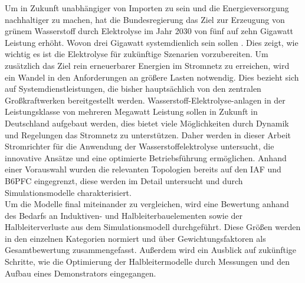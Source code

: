 Um in Zukunft unabhängiger von Importen zu sein und die Energieversorgung nachhaltiger zu machen, hat die Bundesregierung das Ziel zur Erzeugung von grünem Wasserstoff durch Elektrolyse im Jahr 2030 von fünf auf zehn Gigawatt Leistung erhöht. Wovon drei Gigawatt systemdienlich sein sollen \cite{BMWKH2}. Dies zeigt, wie wichtig es ist die Elektrolyse für zukünftige Szenarien vorzubereiten.
Um zusätzlich das Ziel rein erneuerbarer Energien im Stromnetz zu erreichen, wird ein Wandel in den Anforderungen an größere Lasten notwendig. Dies bezieht sich auf Systemdienstleistungen, die bisher hauptsächlich von den zentralen Großkraftwerken bereitgestellt werden. Wasserstoff-Elektrolyse-anlagen in der Leistungsklasse von mehreren Megawatt Leistung sollen in Zukunft in Deutschland aufgebaut werden, dies bietet viele Möglichkeiten durch Dynamik und Regelungen das Stromnetz zu unterstützen. Daher werden in dieser Arbeit Stromrichter für die Anwendung der Wasserstoffelektrolyse untersucht, die innovative Ansätze und eine optimierte Betriebsführung ermöglichen. Anhand einer Vorauswahl wurden die relevanten Topologien bereits auf den \gls{IAF} und \gls{B6PFC} eingegrenzt, diese werden im Detail untersucht und durch Simulationsmodelle charakterisiert.\\
Um die Modelle final miteinander zu vergleichen, wird eine Bewertung anhand des Bedarfs an Induktiven- und Halbleiterbauelementen sowie der Halbleiterverluste aus dem Simulationsmodell durchgeführt. Diese Größen werden in den einzelnen Kategorien normiert und über Gewichtungsfaktoren als Gesamtbewertung zusammengefasst. Außerdem wird ein Ausblick auf zukünftige Schritte, wie die Optimierung der Halbleitermodelle durch Messungen und den Aufbau eines Demonstrators eingegangen.
